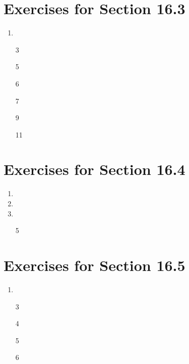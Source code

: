 \documentclass[12pt]{article}
\begin{document}
\section*{Exercises for Section 16.3}
\begin{enumerate}
	\item 
	\item [3]
	\item [5]
	\item [6]
	\item [7]
	\item [9]
	\item [11]
\end{enumerate}
\section*{Exercises for Section 16.4}
\begin{enumerate}
	\item 
	\item 
	\item 
	\item [5]
\end{enumerate}
\section*{Exercises for Section 16.5}
\begin{enumerate}
	\item 
	\item [3]
	\item [4]
	\item [5]
	\item [6]
\end{enumerate}
\end{document}
